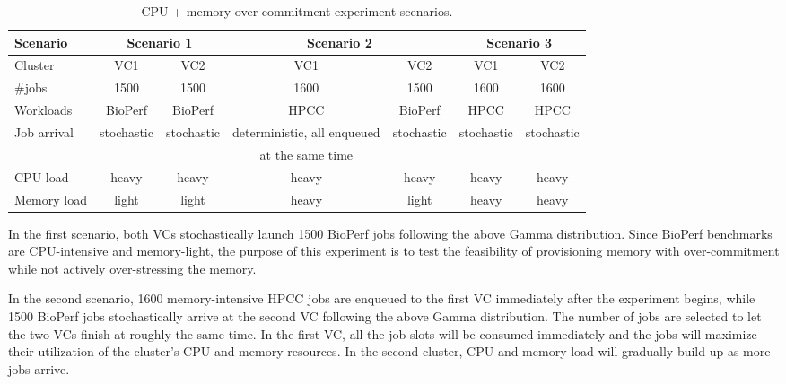\begin{table}[!h]\small
  \caption{CPU + memory over-commitment experiment scenarios.}
  \centering
    \begin{tabular}{|l|c|c|c|c|c|c|}
    \hline
    Scenario & \multicolumn{2}{|c|}{Scenario 1} & \multicolumn{2}{|c|}{Scenario 2} & \multicolumn{2}{|c|}{Scenario 3} \\
    \hline
    Cluster & VC1 & VC2 & VC1 & VC2 & VC1 & VC2 \\
    \hline
    \#jobs & 1500 & 1500 & 1600 & 1500 & 1600 & 1600 \\
    \hline
    Workloads & BioPerf & BioPerf & HPCC & BioPerf & HPCC & HPCC \\
    \hline
    \multirow{2}{*}{Job arrival} & \multirow{2}{*}{stochastic} & \multirow{2}{*}{stochastic} & deterministic, all enqueued & \multirow{2}{*}{stochastic} & \multirow{2}{*}{stochastic} & \multirow{2}{*}{stochastic} \\
                                & &  & at the same time & & & \\
    \hline
    CPU load & heavy & heavy & heavy & heavy & heavy & heavy\\
    \hline
    Memory load & light & light & heavy & light & heavy & heavy \\
    \hline
    \end{tabular}
  \label{tbl:scenarios}
\end{table}

In the first scenario, both VCs stochastically launch 1500 BioPerf jobs following the above Gamma 
distribution. Since BioPerf benchmarks are CPU-intensive and memory-light, the purpose of this 
experiment is to test the feasibility of provisioning memory with over-commitment while not actively over-stressing the memory. 

In the second scenario, 1600 memory-intensive HPCC jobs are enqueued to the first VC immediately after the experiment begins, while 1500 BioPerf jobs stochastically arrive at the second VC following the above Gamma distribution. The number of jobs are selected to let the two VCs finish at roughly the same time. In the first VC, all the job slots will be consumed
immediately and the jobs will maximize their utilization of the cluster's CPU and memory resources. In the second cluster, CPU and memory load will gradually build up as more jobs arrive. 




